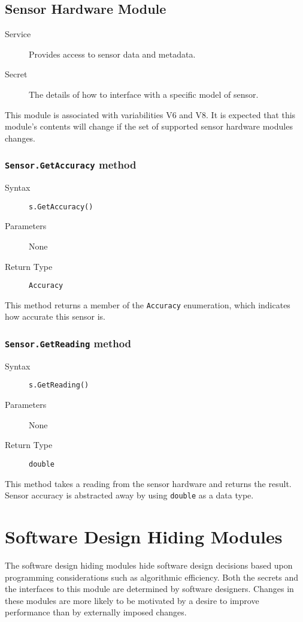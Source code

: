 \documentclass[letterpaper,11pt]{article}
\begin{document}
\subsection{Sensor Hardware Module}
\begin{description}
\item[Service] Provides access to sensor data and metadata.
\item[Secret] The details of how to interface with a specific model of sensor.
\end{description}

This module is associated with variabilities V6 and V8.  It is expected that this module's contents will change if the set of supported sensor hardware modules changes.

\subsubsection{\texttt{Sensor.GetAccuracy} method}
\begin{description}
\item[Syntax] \texttt{s.GetAccuracy()}
\item[Parameters] None
\item[Return Type] \texttt{Accuracy}
\end{description}

This method returns a member of the \texttt{Accuracy} enumeration, which indicates how accurate this sensor is.

\subsubsection{\texttt{Sensor.GetReading} method}
\begin{description}
\item[Syntax] \texttt{s.GetReading()}
\item[Parameters] None
\item[Return Type] \texttt{double}
\end{description}

This method takes a reading from the sensor hardware and returns the result.  Sensor accuracy is abstracted away by using \texttt{double} as a data type.


\section{Software Design Hiding Modules}
The software design hiding modules hide software design decisions based upon programming considerations such as algorithmic efficiency. Both the secrets and the interfaces to this module are determined by software designers. Changes in these modules are more likely to be motivated by a desire to improve performance than by externally imposed changes.
\end{document}
